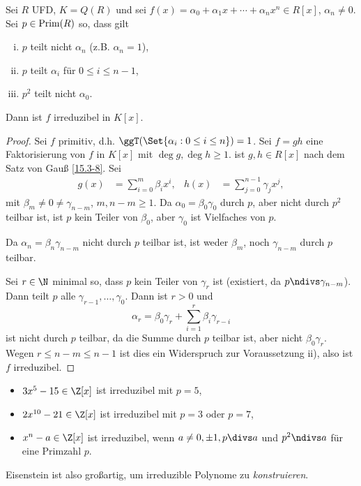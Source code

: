 \begin{st} \label{15.3-14}
	Sei $R$ UFD, $K = Q(R)$ und sei $f(x) = \alpha_0 + \alpha_1 x + \dotsb + \alpha_n x^n \in R[x]$, $\alpha_n \neq 0$.
	Sei $p \in \operatorname{Prim}(R)$ so, dass gilt
	\begin{enumerate}[i)]
		\item
			$p$ teilt nicht $\alpha_n$ (z.B. $\alpha_n = 1$),
		\item
			$p$ teilt $\alpha_i$ für $0 \le i \le n - 1$,
		\item
			$p^2$ teilt nicht $\alpha_0$.
	\end{enumerate}
	Dann ist $f$ irreduzibel in $K[x]$.
	\begin{proof}
		Sei \oBdA $f$ primitiv, d.h. $\ggT(\Set{\alpha_i: 0 \le i \le n}) = 1$.
		Sei $f = gh$ eine Faktorisierung von $f$ in $K[x]$ mit $\deg g, \deg h \ge 1$.
		\OBdA ist $g, h \in R[x]$ nach dem Satz von Gauß \ref{15.3-8}.
		Sei
		\begin{align*}
			g(x) &= \sum_{i=0}^m \beta_i x^i, &
			h(x) &= \sum_{j=0}^{n-1} \gamma_j x^j,
		\end{align*}
		mit $\beta_m \neq 0 \neq \gamma_{n-m}$, $m, n-m \ge 1$.
		Da $\alpha_0 = \beta_0 \gamma_0$ durch $p$, aber nicht durch $p^2$ teilbar ist, ist \oBdA $p$ kein Teiler von $\beta_0$, aber $\gamma_0$ ist Vielfaches von $p$.

		Da $\alpha_n = \beta_n \gamma_{n-m}$ nicht durch $p$ teilbar ist, ist weder $\beta_m$, noch $\gamma_{n-m}$ durch $p$ teilbar.

		Sei $r \in \N$ minimal so, dass $p$ kein Teiler von $\gamma_r$ ist (existiert, da $p \ndivs \gamma_{n-m}$).
		Dann teilt $p$ alle $\gamma_{r-1}, \dotsc, \gamma_0$.
		Dann ist $r > 0$ und
		\[
			\alpha_r = \beta_0\gamma_r + \sum_{i = 1}^r \beta_i \gamma_{r-i}
		\]
		ist nicht durch $p$ teilbar, da die Summe durch $p$ teilbar ist, aber nicht $\beta_0\gamma_r$.
		Wegen $r \le n - m \le n - 1$ ist dies ein Widerspruch zur Voraussetzung ii), also ist $f$ irreduzibel.
	\end{proof}
\end{st}

\begin{ex} \label{15.3-15}
	\begin{itemize}
		\item
			$3x^5 - 15 \in \Z[x]$ ist irreduzibel mit $p = 5$,
		\item
			$2x^{10} - 21 \in \Z[x]$ ist irreduzibel mit $p = 3$ oder $p = 7$,
		\item
			$x^n - a \in \Z[x]$ ist irreduzibel, wenn $a \neq 0, \pm 1, p\divs a$ und $p^2 \ndivs a$ für eine Primzahl $p$.
	\end{itemize}
	Eisenstein ist also großartig, um irreduzible Polynome zu \emph{konstruieren}.
\end{ex}

